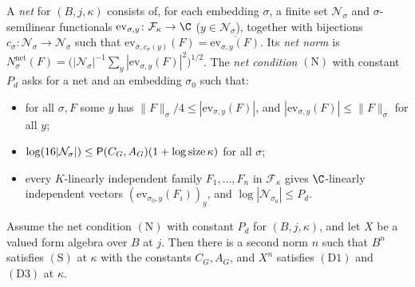 \begin{definition}[Nets]\label{pf:onto1:net}
A \emph{net} for $(B,j,\kappa)$ consists of, for each embedding $\sigma$, a finite set $\mathcal N_\sigma$ and
$\sigma$-semilinear functionals $\mathrm{ev}_{\sigma,y}\colon\mathcal F_\kappa\to\C$ ($y\in\mathcal N_\sigma$), together with
bijections $c_\sigma\colon\mathcal N_\sigma\to\mathcal N_{\bar\sigma}$ such that $\mathrm{ev}_{\bar\sigma,c_\sigma(y)}(F)=
\overline{\mathrm{ev}_{\sigma,y}(F)}$. Its \emph{net norm} is $N^{\mathrm{net}}_\sigma(F)=\bigl(|\mathcal N_\sigma|^{-1}\sum_{y}
|\mathrm{ev}_{\sigma,y}(F)|^2\bigr)^{1/2}$. The \emph{net condition} $(\mathrm N)$ with constant $P_d$ asks for a net and an
embedding $\sigma_0$ such that:
\begin{itemize}
\item for all $\sigma,F$ some $y$ has $\|F\|_\sigma/4\le|\mathrm{ev}_{\sigma,y}(F)|$, and $|\mathrm{ev}_{\sigma,y}(F)|\le\|F\|_\sigma$ for
all $y$;
\item $\log(16|\mathcal N_\sigma|)\le\mathsf{P}(C_G,A_G)(1+\log\operatorname{size}\kappa)$ for all $\sigma$;
\item every $K$-linearly independent family $F_1,\dots,F_n$ in $\mathcal F_\kappa$ gives $\C$-linearly independent vectors
$(\mathrm{ev}_{\sigma_0,y}(F_i))_y$, and $\log|\mathcal N_{\sigma_0}|\le P_d$.
\end{itemize}
\end{definition}

\begin{lemma}\label{pf:onto1:secNorm_of_netIn}
Assume the net condition $(\mathrm N)$ with constant $P_d$ for $(B,j,\kappa)$, and let $X$ be a valued form algebra over
$B$ at $j$. Then there is a second norm $n$ such that $B^n$ satisfies $(\mathrm S)$ at $\kappa$ with the constants $C_G,A_G$,
and $X^n$ satisfies $(\mathrm D1)$ and $(\mathrm D3)$ at $\kappa$.
\end{lemma}

